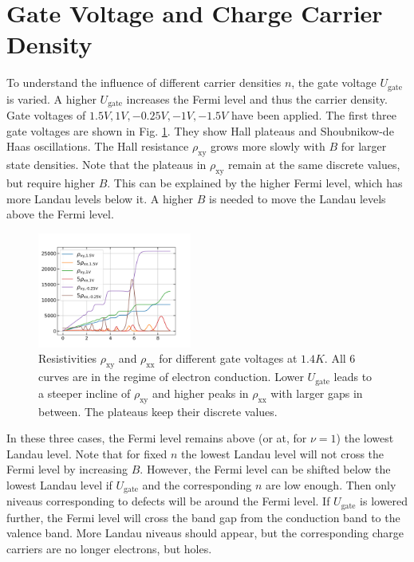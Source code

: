 \section{Gate Voltage and Charge Carrier Density}
To understand the influence of different carrier densities $n$, the gate voltage $U_\text{gate}$ is varied.
A higher $U_\text{gate}$ increases the Fermi level and thus the carrier density.
Gate voltages of $1.5V, 1V, -0.25V, -1V, -1.5V$ have been applied.
The first three gate voltages are shown in Fig. \ref{fig:differentGateVoltagesQHE}.
They show Hall plateaus and Shoubnikow-de Haas oscillations.
The Hall resistance $\rho_\text{xy}$ grows more slowly with $B$ for larger state densities.
Note that the plateaus in $\rho_\text{xy}$ remain at the same discrete values, but require higher $B$.
This can be explained by the higher Fermi level, which has more Landau levels below it.
A higher $B$ is needed to move the Landau levels above the Fermi level.
\begin{figure}[h]
    \centering
    \includegraphics[width=0.45\textwidth]{../Images/differentGateVoltagesQHE.png}
    \caption{Resistivities $\rho_\text{xy}$ and $\rho_\text{xx}$ for different gate voltages at $1.4K$. 
    All 6 curves are in the regime of electron conduction.
    Lower $U_\text{gate}$
     leads to a steeper incline of $\rho_\text{xy}$ and higher peaks in $\rho_\text{xx}$ with larger gaps in between.
    The plateaus keep their discrete values.
}
    \label{fig:differentGateVoltagesQHE}
\end{figure}
In these three cases, the Fermi level remains above (or at, for $\nu=1$) the lowest Landau level.
Note that for fixed $n$ the lowest Landau level will not cross the Fermi level by increasing $B$.
However, the Fermi level can be shifted below the lowest Landau level if $U_\text{gate}$ and the corresponding $n$ are low enough.
Then only niveaus corresponding to defects will be around the Fermi level.
If $U_\text{gate}$ is lowered further, the Fermi level will cross the band gap from the conduction band to the valence band.
More Landau niveaus should appear, but the corresponding charge carriers are no longer electrons, but holes.
